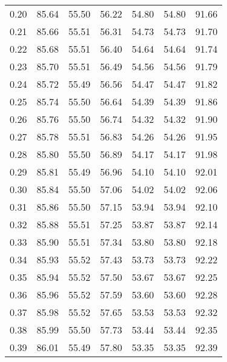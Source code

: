 \begin{tabular}{|c|c|c|c|c|c|c|}
      0.20 &     85.64 &     55.50 &      56.22 &   54.80 &      54.80 &         91.66 \\
      0.21 &     85.66 &     55.51 &      56.31 &   54.73 &      54.73 &         91.70 \\
      0.22 &     85.68 &     55.51 &      56.40 &   54.64 &      54.64 &         91.74 \\
      0.23 &     85.70 &     55.51 &      56.49 &   54.56 &      54.56 &         91.79 \\
      0.24 &     85.72 &     55.49 &      56.56 &   54.47 &      54.47 &         91.82 \\
      0.25 &     85.74 &     55.50 &      56.64 &   54.39 &      54.39 &         91.86 \\
      0.26 &     85.76 &     55.50 &      56.74 &   54.32 &      54.32 &         91.90 \\
      0.27 &     85.78 &     55.51 &      56.83 &   54.26 &      54.26 &         91.95 \\
      0.28 &     85.80 &     55.50 &      56.89 &   54.17 &      54.17 &         91.98 \\
      0.29 &     85.81 &     55.49 &      56.96 &   54.10 &      54.10 &         92.01 \\
      0.30 &     85.84 &     55.50 &      57.06 &   54.02 &      54.02 &         92.06 \\
      0.31 &     85.86 &     55.50 &      57.15 &   53.94 &      53.94 &         92.10 \\
      0.32 &     85.88 &     55.51 &      57.25 &   53.87 &      53.87 &         92.14 \\
      0.33 &     85.90 &     55.51 &      57.34 &   53.80 &      53.80 &         92.18 \\
      0.34 &     85.93 &     55.52 &      57.43 &   53.73 &      53.73 &         92.22 \\
      0.35 &     85.94 &     55.52 &      57.50 &   53.67 &      53.67 &         92.25 \\
      0.36 &     85.96 &     55.52 &      57.59 &   53.60 &      53.60 &         92.28 \\
      0.37 &     85.98 &     55.52 &      57.65 &   53.53 &      53.53 &         92.32 \\
      0.38 &     85.99 &     55.50 &      57.73 &   53.44 &      53.44 &         92.35 \\
      0.39 &     86.01 &     55.49 &      57.80 &   53.35 &      53.35 &         92.39 \\

\end{tabular}
